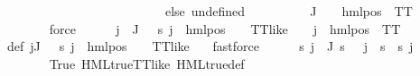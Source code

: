 \begin{isabellebody}
\ \ \ \ \ \ \ \ \ \ \ \ \ \ \ \ \ \ \ \ \ \ \ \ \ \ else\ undefined{\isacharparenright}{\kern0pt}{\isacharparenright}{\kern0pt}{\isachardoublequoteclose}\isanewline
\ \ \ \ \isamarkupfalse%
\ {\isachardoublequoteopen}{\isasymforall}{\isasympsi}\ {\isasymin}\ {\isasymPsi}\ {\isacharbackquote}{\kern0pt}\ J{\isachardot}{\kern0pt}\ {\isasymexists}{\isasymalpha}{\isachardot}{\kern0pt}\ {\isasympsi}\ {\isacharequal}{\kern0pt}\ hml{\isacharunderscore}{\kern0pt}pos\ {\isasymalpha}\ TT{\isachardoublequoteclose}\ \isanewline
\ \ \ \ \ \ \isamarkupfalse%
\ force\isanewline
\ \ \ \ \isamarkupfalse%
\ {\isachardoublequoteopen}{\isasymforall}j\ {\isasymin}\ J{\isachardot}{\kern0pt}\ {\isasymexists}{\isasymalpha}\ {\isasymchi}{\isachardot}{\kern0pt}\ {\isasympsi}s\ j\ {\isacharequal}{\kern0pt}\ hml{\isacharunderscore}{\kern0pt}pos\ {\isasymalpha}\ {\isasymchi}\ {\isasymand}\ TT{\isacharunderscore}{\kern0pt}like\ {\isasymchi}\ {\isasymand}\ {\isasymPsi}\ j\ {\isacharequal}{\kern0pt}\ hml{\isacharunderscore}{\kern0pt}pos\ {\isasymalpha}\ TT{\isachardoublequoteclose}\ \isanewline
\ \ \ \ \ \ \isamarkupfalse%
\ {\isasymPsi}{\isacharunderscore}{\kern0pt}def\ {\isacartoucheopen}{\isasymforall}j{\isasymin}J{\isachardot}{\kern0pt}\ {\isasymexists}{\isasymalpha}\ {\isasymchi}{\isachardot}{\kern0pt}\ {\isasympsi}s\ j\ {\isacharequal}{\kern0pt}\ hml{\isacharunderscore}{\kern0pt}pos\ {\isasymalpha}\ {\isasymchi}\ {\isasymand}\ TT{\isacharunderscore}{\kern0pt}like\ {\isasymchi}{\isacartoucheclose}\ \isamarkupfalse%
\ fastforce\isanewline
\ \ \ \ \isamarkupfalse%
\ {\isachardoublequoteopen}{\isacharparenleft}{\kern0pt}{\isasymforall}s{\isachardot}{\kern0pt}\ {\isasymforall}j\ {\isasymin}\ J{\isachardot}{\kern0pt}\ {\isacharparenleft}{\kern0pt}{\isasymnot}{\isacharparenleft}{\kern0pt}s\ {\isasymTurnstile}\ {\isacharparenleft}{\kern0pt}{\isasymPsi}\ j{\isacharparenright}{\kern0pt}{\isacharparenright}{\kern0pt}\ {\isacharequal}{\kern0pt}\ {\isacharparenleft}{\kern0pt}{\isasymnot}{\isacharparenleft}{\kern0pt}s\ {\isasymTurnstile}\ {\isacharparenleft}{\kern0pt}{\isasympsi}s\ j{\isacharparenright}{\kern0pt}{\isacharparenright}{\kern0pt}{\isacharparenright}{\kern0pt}{\isacharparenright}{\kern0pt}{\isacharparenright}{\kern0pt}{\isachardoublequoteclose}\ \isanewline
\ \ \ \ \ \ \isamarkupfalse%
\ True\ HML{\isacharunderscore}{\kern0pt}true{\isacharunderscore}{\kern0pt}TT{\isacharunderscore}{\kern0pt}like\ HML{\isacharunderscore}{\kern0pt}true{\isacharunderscore}{\kern0pt}def\ \isamarkupfalse%

\end{isabellebody}
